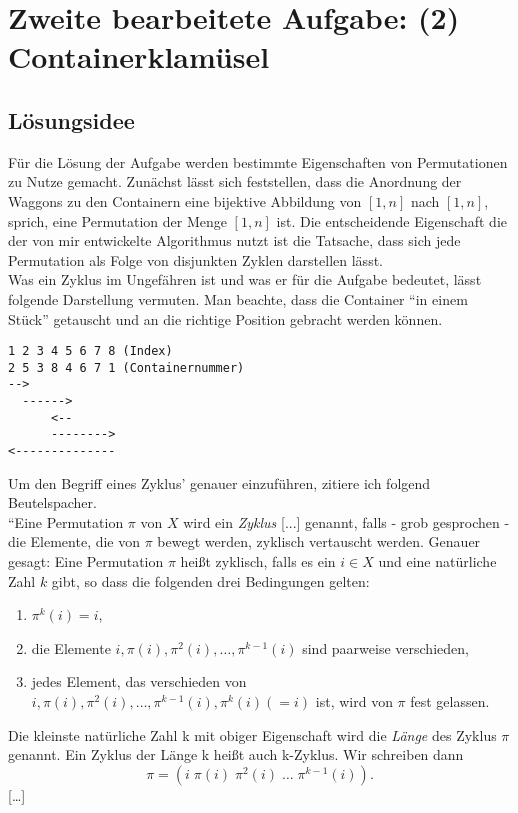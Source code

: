 \section{Zweite bearbeitete Aufgabe: (2) Containerklamüsel}
\secttoc
\subsection{Lösungsidee}
Für die Lösung der Aufgabe werden bestimmte Eigenschaften von Permutationen zu Nutze gemacht. Zunächst lässt sich feststellen, dass
die Anordnung der Waggons zu den Containern eine bijektive Abbildung von $[1,n]$ nach $[1,n]$, sprich, eine Permutation der Menge $[1,n]$ ist.
Die entscheidende Eigenschaft die der von mir entwickelte Algorithmus nutzt ist die Tatsache, dass
sich jede Permutation als Folge von disjunkten Zyklen darstellen lässt.\\
Was ein Zyklus im Ungefähren ist und was er für die Aufgabe bedeutet, lässt folgende Darstellung vermuten.
Man beachte, dass die Container ``in einem Stück'' getauscht und an die richtige Position gebracht werden können.
\lstset{basicstyle=\ttfamily\small}
\begin{lstlisting}
1 2 3 4 5 6 7 8 (Index)
2 5 3 8 4 6 7 1 (Containernummer)
-->
  ------>
      <--
      -------->
<--------------
\end{lstlisting}
\lstset{basicstyle=\ttfamily\normalsize}
Um den Begriff eines Zyklus' genauer einzuführen, zitiere ich folgend Beutelspacher. \\
``Eine Permutation $\pi$ von $X$ wird ein \emph{Zyklus} [...] genannt, falls - grob gesprochen - die Elemente, die von $\pi$ bewegt werden,
zyklisch vertauscht werden. Genauer gesagt: Eine Permutation $\pi$ heißt zyklisch,
falls es ein $ i \in X$ und eine natürliche Zahl $k$ gibt, so dass die folgenden drei Bedingungen gelten:
\begin{enumerate}
 \item $\pi^k(i) = i$,
 \item die Elemente $i,\pi(i),\pi^2(i),\dots,\pi^{k-1}(i)$ sind paarweise verschieden,
 \item jedes Element, das verschieden von $i,\pi(i),\pi^2(i),\dots,\pi^{k-1}(i), \pi^k(i) (=i)$ ist, wird von $\pi$ fest gelassen.
\end{enumerate}
Die kleinste natürliche Zahl k mit obiger Eigenschaft wird die \emph{Länge} des Zyklus $\pi$ genannt.
Ein Zyklus der Länge k heißt auch k-Zyklus. Wir schreiben dann \[\pi=(i\;\pi(i)\;\pi^2(i) \; \dots \;\pi^{k-1}(i)).\]
[\dots]

